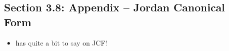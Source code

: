 \documentclass[../notes.tex]{subfiles}
\begin{document}
\subsection*{Section 3.8: Appendix -- Jordan Canonical Form}
\begin{itemize}
    \item \textcite{bib:Teschl} has quite a bit to say on JCF!
\end{itemize}
\end{document}
